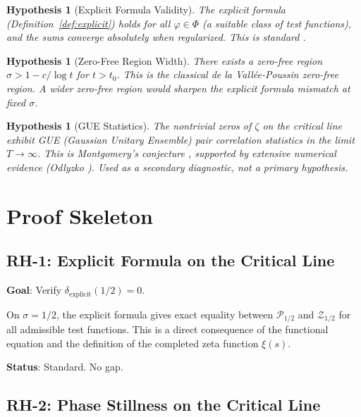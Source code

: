 \documentclass[11pt]{article}
\newtheorem{hypothesis}[lemma]{Hypothesis}
\theoremstyle{definition}
\begin{document}
\begin{hypothesis}[Explicit Formula Validity]
\label{hyp:explicit}
The explicit formula (Definition~\ref{def:explicit}) holds for all
$\varphi \in \Phi$ (a suitable class of test functions), and the sums
converge absolutely when regularized.  This is standard \cite{IK}.
\end{hypothesis}

\begin{hypothesis}[Zero-Free Region Width]
\label{hyp:zerofree}
There exists a zero-free region $\sigma > 1 - c / \log t$ for $t > t_0$.
This is the classical de la Vall\'ee-Poussin zero-free region.
A wider zero-free region would sharpen the explicit formula mismatch
at fixed $\sigma$.
\end{hypothesis}

\begin{hypothesis}[GUE Statistics]
\label{hyp:GUE}
The nontrivial zeros of $\zeta$ on the critical line exhibit GUE
(Gaussian Unitary Ensemble) pair correlation statistics
in the limit $T \to \infty$.  This is Montgomery's conjecture \cite{Mont},
supported by extensive numerical evidence (Odlyzko \cite{Odl}).
Used as a secondary diagnostic, not a primary hypothesis.
\end{hypothesis}

\section{Proof Skeleton}

\subsection{RH-1: Explicit Formula on the Critical Line}

\textbf{Goal}: Verify $\delta_{\mathrm{explicit}}(1/2) = 0$.

On $\sigma = 1/2$, the explicit formula gives exact equality between
$\mathcal{P}_{1/2}$ and $\mathcal{Z}_{1/2}$ for all admissible test functions.
This is a direct consequence of the functional equation and the definition
of the completed zeta function $\xi(s)$.

\textbf{Status}: Standard.  No gap.

\subsection{RH-2: Phase Stillness on the Critical Line}
\end{document}
